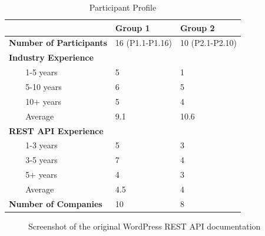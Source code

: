 \documentclass[conference]{IEEEtran}
\begin{document}
\begin{table}[!tbh]
  \caption{Participant Profile}
  \label{table:participants}

\begin{tabular}{|p{0.8in} p{.6in} p{0.7in} p{0.7in}|}

\hline
& & \textbf{Group 1} & \textbf{Group 2}\\
\hline
\multicolumn{2}{|l}{\textbf{Number of Participants}} & 16 (P1.1-P1.16) & 10 (P2.1-P2.10) \\
\hline
\multicolumn{4}{|l|}{\textbf{Industry Experience}} \\
& 1-5 years & 5 & 1 \\
& 5-10 years & 6 & 5 \\
& 10+ years & 5 & 4 \\
& Average & 9.1 & 10.6 \\
\hline

\multicolumn{4}{|l|}{\textbf{REST API Experience}} \\
&   1-3 years & 5 & 3 \\
&   3-5 years & 7 & 4 \\
&   5+ years & 4 & 3 \\
&   Average & 4.5 & 4 \\

\hline
\multicolumn{2}{|l}{\textbf{Number of Companies}} & 10 & 8 \\
\hline
\end{tabular}

\end{table}

\begin{figure}[t]
\begin{center}
\end{center}
\caption{Screenshot of the original WordPress REST API documentation}
\label{fig:original}
\end{figure}
\end{document}
